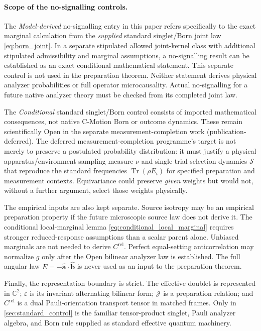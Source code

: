 \documentclass[11pt]{article}
\theoremstyle{remark}
\newcommand{\cmotion}{\mbox{C-Motion}}
\newcommand{\CC}{\mathbb{C}}
\newcommand{\ahat}{\hat{\bm a}}
\newcommand{\bhat}{\hat{\bm b}}
\newcommand{\epsm}{\varepsilon}
\newcommand{\Jmap}{\mathcal J}
\newcommand{\Crel}{C^{\mathrm{rel}}}
\begin{document}
\paragraph{Scope of the no-signalling controls.}
The \emph{Model-derived} no-signalling entry in this paper refers specifically
to the exact marginal calculation from the \emph{supplied} standard singlet/Born
joint law \eqref{eq:born_joint}.  In a separate stipulated allowed joint-kernel
class with additional stipulated admissibility and marginal assumptions,
a no-signalling result can be established as an exact conditional
mathematical statement.  This separate control is not used in the preparation
theorem.  Neither statement derives physical analyzer probabilities or full
operator microcausality.  Actual no-signalling for a future native analyzer theory
must be checked from its completed joint law.

The \emph{Conditional} standard singlet/Born control consists of imported
mathematical consequences, not native \cmotion{} Born or outcome dynamics.  These remain scientifically Open in the separate
measurement-completion work (publication-deferred).  The deferred measurement-completion programme's target is not merely
to preserve a postulated probability distribution: it must justify a
physical apparatus/environment sampling measure \(\nu\) and single-trial
selection dynamics \(\mathcal S\) that reproduce the standard frequencies
\(\operatorname{Tr}(\rho E_i)\) for specified preparation and measurement
contexts.  Equivariance could preserve \emph{given} weights but would not,
without a further argument, select those weights physically.

The empirical inputs are also kept separate.  Source isotropy may be an empirical preparation
property if the future microscopic source law does not derive it.  The
conditional local-marginal lemma \eqref{eq:conditional_local_marginal}
requires stronger reduced-response assumptions than a scalar parent alone.
Unbiased marginals are not needed to derive \(\Crel\).  Perfect equal-setting anticorrelation may normalize \(g\) only after the Open
bilinear analyzer law is established.  The full angular law \(E=-\ahat\cdot\bhat\) is never used as
an input to the preparation theorem.

Finally, the representation boundary is strict.  The effective doublet is represented in
\(\CC^2\); \(\epsm\) is its invariant alternating bilinear form; \(\Jmap\) is a preparation relation;
and \(\Crel\) is a dual Pauli-orientation transport tensor in matched frames.  Only in \cref{sec:standard_control} is the familiar
tensor-product singlet, Pauli analyzer algebra, and Born rule supplied as standard effective quantum
machinery.
\end{document}
